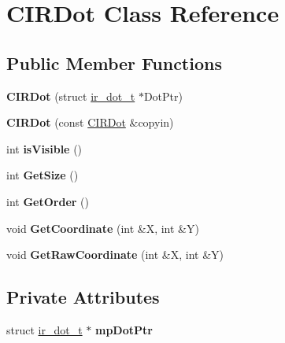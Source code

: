 \hypertarget{class_c_i_r_dot}{\section{C\-I\-R\-Dot Class Reference}
\label{class_c_i_r_dot}
}
\subsection*{Public Member Functions}
\begin{DoxyCompactItemize}
\item 
\hypertarget{class_c_i_r_dot_ae2b021d5fea77cea85cac86f4741a995}{{\bfseries C\-I\-R\-Dot} (struct \hyperlink{structir__dot__t}{ir\-\_\-dot\-\_\-t} $\ast$Dot\-Ptr)}\label{class_c_i_r_dot_ae2b021d5fea77cea85cac86f4741a995}

\item 
\hypertarget{class_c_i_r_dot_abed3b30052805bc25e54dacec11f35a8}{{\bfseries C\-I\-R\-Dot} (const \hyperlink{class_c_i_r_dot}{C\-I\-R\-Dot} \&copyin)}\label{class_c_i_r_dot_abed3b30052805bc25e54dacec11f35a8}

\item 
\hypertarget{class_c_i_r_dot_a52d88e14f8b1926faefb3c7ae3392a81}{int {\bfseries is\-Visible} ()}\label{class_c_i_r_dot_a52d88e14f8b1926faefb3c7ae3392a81}

\item 
\hypertarget{class_c_i_r_dot_a55d84ee46d123c4cee2d5972f3416674}{int {\bfseries Get\-Size} ()}\label{class_c_i_r_dot_a55d84ee46d123c4cee2d5972f3416674}

\item 
\hypertarget{class_c_i_r_dot_a820ce87be176b3d2cf15f27b7fe60ee3}{int {\bfseries Get\-Order} ()}\label{class_c_i_r_dot_a820ce87be176b3d2cf15f27b7fe60ee3}

\item 
\hypertarget{class_c_i_r_dot_a1eee8cc3c7dcdb20c0e73792386bb215}{void {\bfseries Get\-Coordinate} (int \&X, int \&Y)}\label{class_c_i_r_dot_a1eee8cc3c7dcdb20c0e73792386bb215}

\item 
\hypertarget{class_c_i_r_dot_aba4908bf9d66671639b8b767df162796}{void {\bfseries Get\-Raw\-Coordinate} (int \&X, int \&Y)}\label{class_c_i_r_dot_aba4908bf9d66671639b8b767df162796}

\end{DoxyCompactItemize}
\subsection*{Private Attributes}
\begin{DoxyCompactItemize}
\item 
\hypertarget{class_c_i_r_dot_a82b8b5361047f551074d7f9cf8d5d2ac}{struct \hyperlink{structir__dot__t}{ir\-\_\-dot\-\_\-t} $\ast$ {\bfseries mp\-Dot\-Ptr}}\label{class_c_i_r_dot_a82b8b5361047f551074d7f9cf8d5d2ac}

\end{DoxyCompactItemize}


